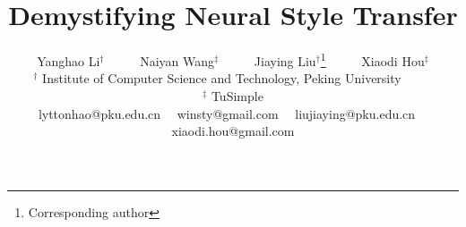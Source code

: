 \documentclass{article}
\begin{document}
\title{Demystifying Neural Style Transfer}

\author{Yanghao Li$^\dagger$~~~~~ Naiyan Wang$^\ddagger$~~~~~ Jiaying Liu$^\dagger$\thanks{Corresponding author}~~~~~ Xiaodi Hou$^\ddagger$\\
$^\dagger$ Institute of Computer Science and Technology, Peking University~~~~~\\
$^\ddagger$ TuSimple\\
{ lyttonhao@pku.edu.cn}~~{ winsty@gmail.com}~~
{ liujiaying@pku.edu.cn}~~
{ xiaodi.hou@gmail.com}
}

\maketitle
{}

\graphicspath{{figures/}}
\end{document}
